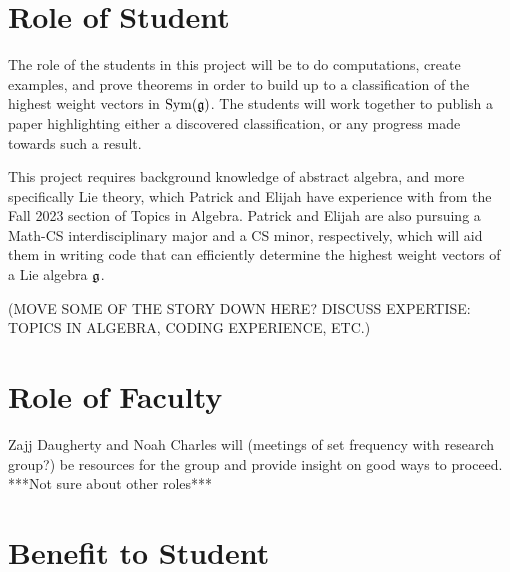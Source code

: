 \documentclass[11pt, reqno]{amsart}
\begin{document}
\section{Role of Student}

The role of the students in this project will be to do computations, create examples, and prove theorems in order to build up to a classification of the highest weight vectors in $\operatorname{Sym}(\mathfrak{g})$. The students will work together to publish a paper highlighting either a discovered classification, or any progress made towards such a result. 

This project requires background knowledge of abstract algebra, and more specifically Lie theory, which Patrick and Elijah have experience with from the Fall 2023 section of Topics in Algebra. Patrick and Elijah are also pursuing a Math-CS interdisciplinary major and a CS minor, respectively, which will aid them in writing code that can efficiently determine the highest weight vectors of a Lie algebra $\mathfrak{g}$.


(MOVE SOME OF THE STORY DOWN HERE? DISCUSS EXPERTISE: TOPICS IN ALGEBRA, CODING EXPERIENCE, ETC.) 

\section{Role of Faculty}

Zajj Daugherty and Noah Charles will (meetings of set frequency with research group?) be resources for the group and provide insight on good ways to proceed. ***Not sure about other roles***

\section{Benefit to Student}


\printbibliography
\end{document}

